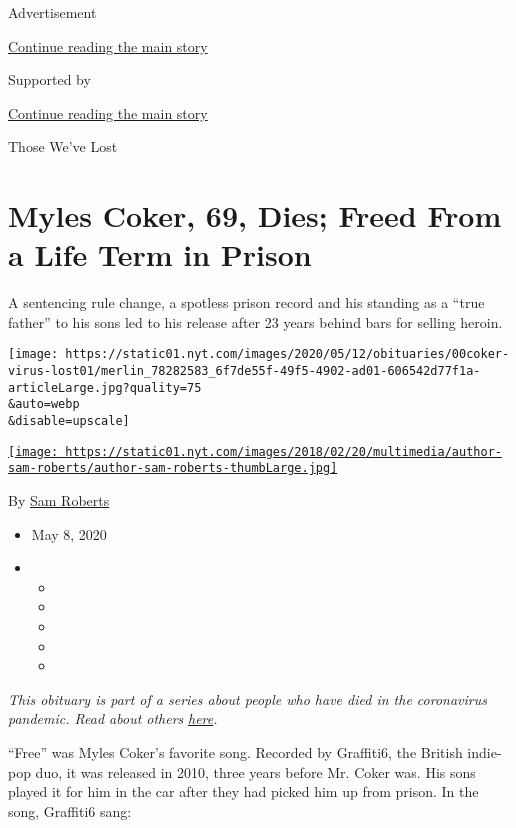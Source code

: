 Advertisement

\protect\hyperlink{after-top}{Continue reading the main story}

Supported by

\protect\hyperlink{after-sponsor}{Continue reading the main story}

Those We've Lost

\hypertarget{myles-coker-69-dies-freed-from-a-life-term-in-prison}{%
\section{Myles Coker, 69, Dies; Freed From a Life Term in
Prison}\label{myles-coker-69-dies-freed-from-a-life-term-in-prison}}

A sentencing rule change, a spotless prison record and his standing as a
``true father'' to his sons led to his release after 23 years behind
bars for selling heroin.

\texttt{[image: https://static01.nyt.com/images/2020/05/12/obituaries/00coker-virus-lost01/merlin\_78282583\_6f7de55f-49f5-4902-ad01-606542d77f1a-articleLarge.jpg?quality=75\\\&auto=webp\\\&disable=upscale]}

\href{https://www.nytimes.com/by/sam-roberts}{\texttt{[image: https://static01.nyt.com/images/2018/02/20/multimedia/author-sam-roberts/author-sam-roberts-thumbLarge.jpg]}}

By \href{https://www.nytimes.com/by/sam-roberts}{Sam Roberts}

\begin{itemize}
\item
  May 8, 2020
\item
  \begin{itemize}
  \item
  \item
  \item
  \item
  \item
  \end{itemize}
\end{itemize}

\emph{This obituary is part of a series about people who have died in
the coronavirus pandemic. Read about others}
\href{https://www.nytimes.com/series/people-who-have-died-of-the-coronavirus}{\emph{here}}\emph{.}

``Free'' was Myles Coker's favorite song. Recorded by Graffiti6, the
British indie-pop duo, it was released in 2010, three years before Mr.
Coker was. His sons played it for him in the car after they had picked
him up from prison. In the song, Graffiti6 sang:

